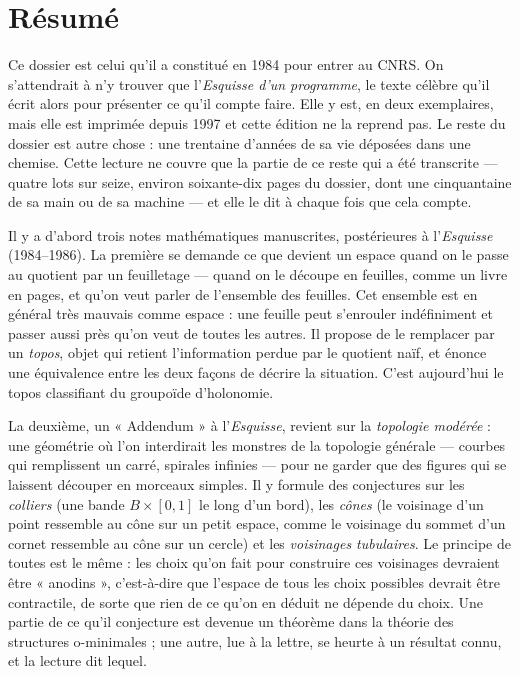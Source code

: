 \documentclass[11pt,a4paper]{article}
\begin{document}
\section*{Résumé}

\begin{resume}
Ce dossier est celui qu'il a constitué en 1984 pour entrer au CNRS. On
s'attendrait à n'y trouver que l'\emph{Esquisse d'un programme}, le texte
célèbre qu'il écrit alors pour présenter ce qu'il compte faire. Elle y est,
en deux exemplaires, mais elle est imprimée depuis 1997 et cette édition ne la
reprend pas. Le reste du dossier est autre chose : une trentaine d'années de
sa vie déposées dans une chemise. Cette lecture ne couvre que la partie de ce
reste qui a été transcrite — quatre lots sur seize, environ soixante-dix
pages du dossier, dont une cinquantaine de sa main ou de sa machine — et elle
le dit à chaque fois que cela
compte.

Il y a d'abord trois notes mathématiques manuscrites, postérieures à
l'\emph{Esquisse} (1984--1986). La première se demande ce que devient un
espace quand on le passe au quotient par un feuilletage — quand on le découpe en
feuilles, comme un livre en pages, et qu'on veut parler de l'ensemble des
feuilles. Cet ensemble est en général très mauvais comme espace : une feuille
peut s'enrouler indéfiniment et passer aussi près qu'on veut de toutes les
autres. Il propose de le remplacer par un \emph{topos}, objet qui retient
l'information perdue par le quotient naïf, et énonce une équivalence entre
les deux façons de décrire la situation. C'est aujourd'hui le topos classifiant
du groupoïde d'holonomie.

La deuxième, un « Addendum » à l'\emph{Esquisse}, revient sur la
\emph{topologie modérée} : une géométrie où l'on interdirait les monstres de la
topologie générale — courbes qui remplissent un carré, spirales infinies —
pour ne garder que des figures qui se laissent découper en morceaux simples.
Il y formule des conjectures sur les \emph{colliers} (une bande $B \times
[0,1]$ le long d'un bord), les \emph{cônes} (le voisinage d'un point
ressemble au cône sur un petit espace, comme le voisinage du sommet d'un
cornet ressemble au cône sur un cercle) et les \emph{voisinages tubulaires}.
Le principe de toutes est le même : les choix qu'on fait pour construire ces
voisinages devraient être « anodins », c'est-à-dire que l'espace de tous les
choix possibles devrait être contractile, de sorte que rien de ce qu'on en
déduit ne dépende du choix. Une partie de ce qu'il conjecture est devenue un
théorème dans la théorie des structures o-minimales ; une autre, lue à la
lettre, se heurte à un résultat connu, et la lecture dit lequel.


\end{resume}
\end{document}
